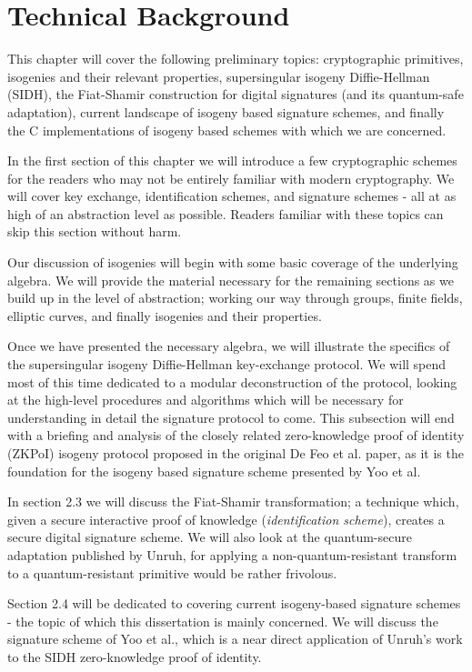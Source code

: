 \chapter{Technical Background}

This chapter will cover the following preliminary topics: cryptographic primitives, isogenies and their relevant properties, supersingular isogeny Diffie-Hellman (SIDH), the Fiat-Shamir construction for digital signatures (and its quantum-safe adaptation), current landscape of isogeny based signature schemes, and finally the C implementations of isogeny based schemes with which we are concerned.

In the first section of this chapter we will introduce a few cryptographic schemes for the readers who may not be entirely familiar with modern cryptography. We will cover key exchange, identification schemes, and signature schemes - all at as high of an abstraction level as possible. Readers familiar with these topics can skip this section without harm. 

Our discussion of isogenies will begin with some basic coverage of the underlying algebra. We will provide the material necessary for the remaining sections as we build up in the level of abstraction; working our way through groups, finite fields, elliptic curves, and finally isogenies and their properties.

Once we have presented the necessary algebra, we will illustrate the specifics of the supersingular isogeny Diffie-Hellman key-exchange protocol. We will spend most of this time dedicated to a modular deconstruction of the protocol, looking at the high-level procedures and algorithms which will be necessary for understanding in detail the signature protocol to come. This subsection will end with a briefing and analysis of the closely related zero-knowledge proof of identity (ZKPoI) isogeny protocol proposed in the original De Feo et al. paper\cite{djp}, as it is the foundation for the isogeny based signature scheme presented by Yoo et al\cite{yoo}.

In section 2.3 we will discuss the Fiat-Shamir transformation\cite{sigs}; a technique which, given a secure interactive proof of knowledge (\emph{identification scheme}), creates a secure digital signature scheme. We will also look at the quantum-secure adaptation published by Unruh\cite{unruh}, for applying a non-quantum-resistant transform to a quantum-resistant primitive would be rather frivolous.

Section 2.4 will be dedicated to covering current isogeny-based signature schemes - the topic of which this dissertation is mainly concerned. We will discuss the signature scheme of Yoo et al., which is a near direct application of Unruh's work to the SIDH zero-knowledge proof of identity.

